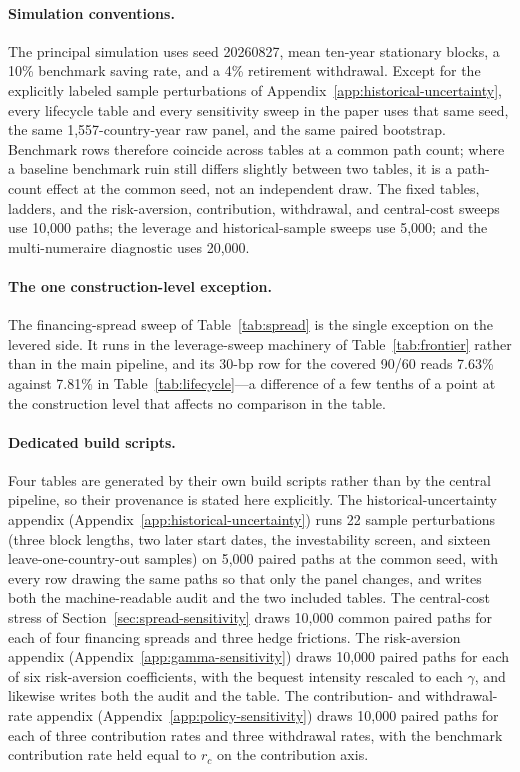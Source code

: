 \documentclass[11pt]{article}
\begin{document}
\paragraph{Simulation conventions.} The principal simulation uses seed
20260827, mean ten-year stationary blocks, a 10\% benchmark saving rate, and a
4\% retirement withdrawal. Except for the explicitly labeled sample
perturbations of Appendix~\ref{app:historical-uncertainty}, every lifecycle
table and every sensitivity sweep in the paper uses that same seed, the same
1{,}557-country-year raw panel, and the same paired bootstrap. Benchmark rows
therefore coincide across tables at a common path count; where a baseline
benchmark ruin still differs slightly between two tables, it is a path-count
effect at the common seed, not an independent draw. The fixed tables, ladders,
and the risk-aversion, contribution, withdrawal, and central-cost sweeps use
10{,}000 paths; the leverage and historical-sample sweeps use 5{,}000; and the
multi-numeraire diagnostic uses 20{,}000.

\paragraph{The one construction-level exception.} The financing-spread sweep
of Table~\ref{tab:spread} is the single exception on the levered side. It runs
in the leverage-sweep machinery of Table~\ref{tab:frontier} rather than in the
main pipeline, and its 30-bp row for the covered 90/60 reads 7.63\% against
7.81\% in Table~\ref{tab:lifecycle}---a difference of a few tenths of a point
at the construction level that affects no comparison in the table.

\paragraph{Dedicated build scripts.} Four tables are generated by their own
build scripts rather than by the central pipeline, so their provenance is
stated here explicitly. The historical-uncertainty appendix
(Appendix~\ref{app:historical-uncertainty}) runs 22 sample perturbations
(three block lengths, two later start dates, the investability screen, and
sixteen leave-one-country-out samples) on 5{,}000 paired paths at the common
seed, with every row drawing the same paths so that only the panel changes,
and writes both the machine-readable audit and the two included tables. The
central-cost stress of Section~\ref{sec:spread-sensitivity} draws 10{,}000
common paired paths for each of four financing spreads and three hedge
frictions. The risk-aversion appendix (Appendix~\ref{app:gamma-sensitivity})
draws 10{,}000 paired paths for each of six risk-aversion coefficients, with
the bequest intensity rescaled to each $\gamma$, and likewise writes both the
audit and the table. The contribution- and withdrawal-rate appendix
(Appendix~\ref{app:policy-sensitivity}) draws 10{,}000 paired paths for each
of three contribution rates and three withdrawal rates, with the benchmark
contribution rate held equal to $r_c$ on the contribution axis.
\end{document}
